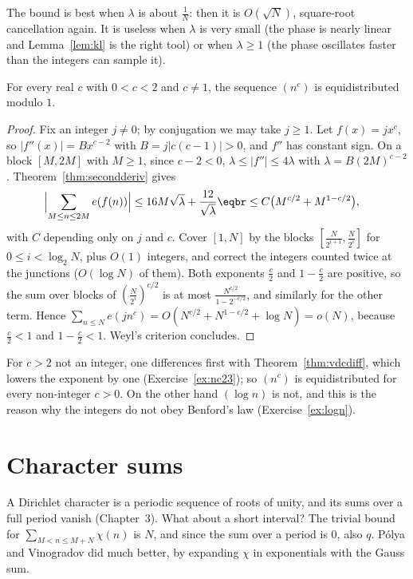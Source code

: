 The bound is best when $\lambda$ is about $\frac1N$: then it is $O(\sqrt N)$, square-root cancellation again. It is useless when $\lambda$ is very small (the phase is nearly linear and Lemma~\ref{lem:kl}
is the right tool) or when $\lambda\ge1$ (the phase oscillates faster than the integers can sample it).

\begin{theorem}\label{thm:nc}
For every real $c$ with $0<c<2$ and $c\ne1$, the sequence $(n^c)$ is equidistributed modulo $1$.
\end{theorem}

\begin{proof}
Fix an integer $j\ne0$; by conjugation we may take $j\ge1$. Let $f(x)=jx^c$, so $|f''(x)|=Bx^{c-2}$ with $B=j|c(c-1)|>0$, and $f''$ has constant sign. On a block $[M,2M]$ with $M\ge1$, since $c-2<0$,
$\lambda\le|f''|\le4\lambda$ with $\lambda=B(2M)^{c-2}$. Theorem~\ref{thm:secondderiv} gives
\[
\begin{aligned}\Bigl|\sum_{M\le n\le2M}e(f(n))\Bigr|&\le16M\sqrt\lambda+\frac{12}{\sqrt\lambda}\eqbr\le C\bigl(M^{c/2}+M^{1-c/2}\bigr),\end{aligned}
\]
with $C$ depending only on $j$ and $c$. Cover $[1,N]$ by the blocks $[\frac N{2^{i+1}},\frac N{2^i}]$ for $0\le i<\log_2N$, plus $O(1)$ integers, and correct the integers counted twice at the junctions ($O(\log N)$ of them). Both exponents
$\frac c2$ and $1-\frac c2$ are positive, so the sum over blocks of $(\frac N{2^i})^{c/2}$ is at most $\frac{N^{c/2}}{1-2^{-c/2}}$, and similarly for the other term. Hence $\sum_{n\le N}e(jn^c)=O(N^{c/2}+N^{1-c/2}+\log N)=o(N)$, because
$\frac c2<1$ and $1-\frac c2<1$. Weyl's criterion concludes.
\end{proof}

For $c>2$ not an integer, one differences first with Theorem~\ref{thm:vdcdiff}, which lowers the exponent by one (Exercise~\ref{ex:nc23}); so $(n^c)$ is equidistributed for every non-integer $c>0$. On the other hand
$(\log n)$ is not, and this is the reason why the integers do not obey Benford's law (Exercise~\ref{ex:logn}).

\section{Character sums}

A Dirichlet character is a periodic sequence of roots of unity, and its sums over a full period vanish (Chapter~3). What about a short interval? The trivial bound for $\sum_{M<n\le M+N}\chi(n)$ is $N$, and since the sum over
a period is $0$, also $q$. Pólya and Vinogradov did much better, by expanding $\chi$ in exponentials with the Gauss sum.

